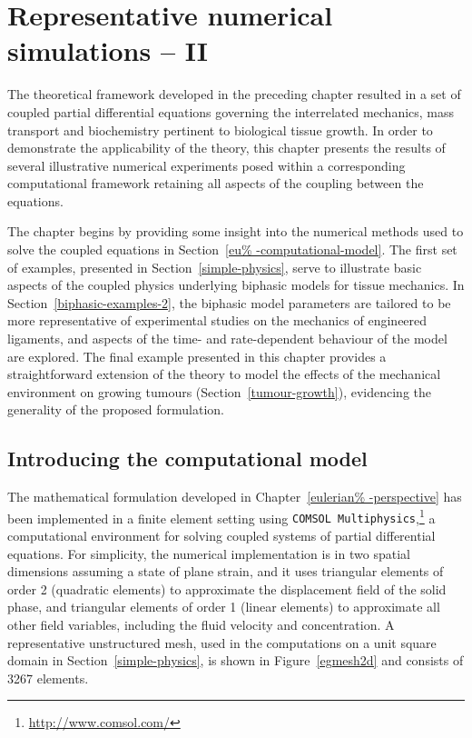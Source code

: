 \chapter{Representative numerical simulations -- II}
\label{numerical-simulations-2}

The theoretical framework developed in the preceding chapter resulted
in a set of coupled partial differential equations governing the
interrelated mechanics, mass transport and biochemistry pertinent to
biological tissue growth. In order to demonstrate the applicability of
the theory, this chapter presents the results of several illustrative
numerical experiments posed within a corresponding computational
framework retaining all aspects of the coupling between the equations.

The chapter begins by providing some insight into the numerical
methods used to solve the coupled equations in Section~\ref{eu%
  -computational-model}. The first set of examples, presented in
Section~\ref{simple-physics}, serve to illustrate basic aspects of the
coupled physics underlying biphasic models for tissue mechanics. In
Section~\ref{biphasic-examples-2}, the biphasic model parameters are
tailored to be more representative of experimental studies on the
mechanics of engineered ligaments, and aspects of the time- and
rate-dependent behaviour of the model are explored. The final example
presented in this chapter provides a straightforward extension of the
theory to model the effects of the mechanical environment on growing
tumours (Section~\ref{tumour-growth}), evidencing the generality of
the proposed formulation.

\section{Introducing the computational model}
\label{eu-computational-model}

The mathematical formulation developed in Chapter~\ref{eulerian%
  -perspective} has been implemented in a finite element setting using
{\tt COMSOL Multiphysics},\footnote{\href {http://www.comsol.com/}
  {http://www.comsol.com/}} a computational environment for solving
coupled systems of partial differential equations. For simplicity, the
numerical implementation is in two spatial dimensions assuming a state
of plane strain, and it uses triangular elements of order 2 (quadratic
elements) to approximate the displacement field of the solid phase,
and triangular elements of order 1 (linear elements) to approximate
all other field variables, including the fluid velocity and
concentration. A representative unstructured mesh, used in the
computations on a unit square domain in Section~\ref{simple-physics},
is shown in Figure~\ref{egmesh2d} and consists of 3267 elements.


